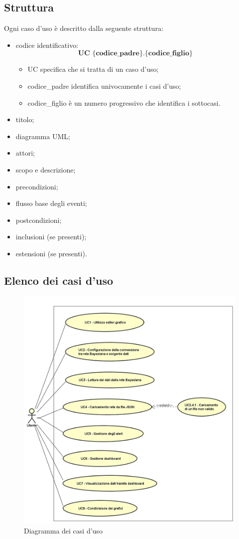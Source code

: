 \subsection{Struttura}
Ogni caso d'uso è descritto dalla seguente struttura:
\begin{itemize}
	\item codice identificativo: $$ \textbf{UC \{codice\_padre\}.\{codice\_figlio\}  } $$
	\begin{itemize}
		\item UC specifica che si tratta di un caso d'uso;
		\item codice\_padre identifica univocamente i casi d'uso;
		\item codice\_figlio è un numero progressivo che identifica i sottocasi.
	\end{itemize}
	\item titolo;
	\item diagramma UML;
	\item attori;
	\item scopo e descrizione;
	\item precondizioni;
	\item flusso base degli eventi;
	\item postcondizioni;
	\item inclusioni (se presenti);
	\item estensioni (se presenti).
\end{itemize}

\newpage
\subsection{Elenco dei casi d'uso}
\begin{figure} [H]
	\centering
	\includegraphics[scale=0.5]{Img/UC}
	\caption{Diagramma dei casi d'uso}\label{}
\end{figure}
